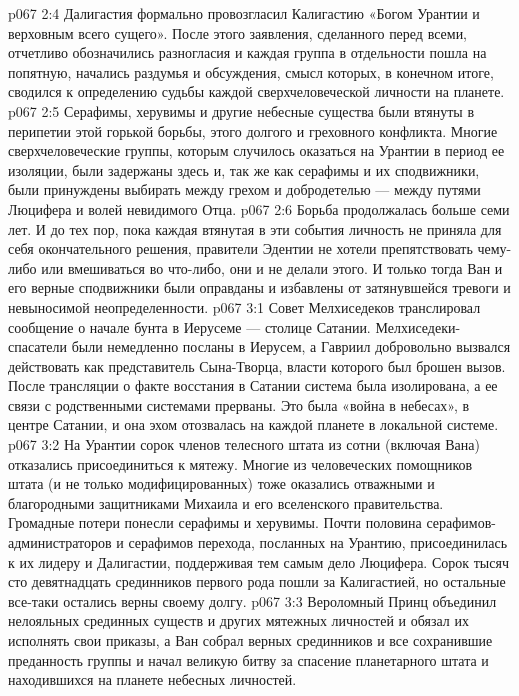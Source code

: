 \vs p067 2:4 \pc Далигастия формально провозгласил Калигастию «Богом Урантии и верховным всего сущего». После этого заявления, сделанного перед всеми, отчетливо обозначились разногласия и каждая группа в отдельности пошла на попятную, начались раздумья и обсуждения, смысл которых, в конечном итоге, сводился к определению судьбы каждой сверхчеловеческой личности на планете.
\vs p067 2:5 Серафимы, херувимы и другие небесные существа были втянуты в перипетии этой горькой борьбы, этого долгого и греховного конфликта. Многие сверхчеловеческие группы, которым случилось оказаться на Урантии в период ее изоляции, были задержаны здесь и, так же как серафимы и их сподвижники, были принуждены выбирать между грехом и добродетелью --- между путями Люцифера и волей невидимого Отца.
\vs p067 2:6 Борьба продолжалась больше семи лет. И до тех пор, пока каждая втянутая в эти события личность не приняла для себя окончательного решения, правители Эдентии не хотели препятствовать чему\hyp{}либо или вмешиваться во что\hyp{}либо, они и не делали этого. И только тогда Ван и его верные сподвижники были оправданы и избавлены от затянувшейся тревоги и невыносимой неопределенности.
\vs p067 3:1 Совет Мелхиседеков транслировал сообщение о начале бунта в Иерусеме --- столице Сатании. Мелхиседеки\hyp{}спасатели были немедленно посланы в Иерусем, а Гавриил добровольно вызвался действовать как представитель Сына\hyp{}Творца, власти которого был брошен вызов. После трансляции о факте восстания в Сатании система была изолирована, а ее связи с родственными системами прерваны. Это была «война в небесах», в центре Сатании, и она эхом отозвалась на каждой планете в локальной системе.
\vs p067 3:2 На Урантии сорок членов телесного штата из сотни (включая Вана) отказались присоединиться к мятежу. Многие из человеческих помощников штата (и не только модифицированных) тоже оказались отважными и благородными защитниками Михаила и его вселенского правительства. Громадные потери понесли серафимы и херувимы. Почти половина серафимов\hyp{}администраторов и серафимов перехода, посланных на Урантию, присоединилась к их лидеру и Далигастии, поддерживая тем самым дело Люцифера. Сорок тысяч сто девятнадцать срединников первого рода пошли за Калигастией, но остальные все\hyp{}таки остались верны своему долгу.
\vs p067 3:3 Вероломный Принц объединил нелояльных срединных существ и других мятежных личностей и обязал их исполнять свои приказы, а Ван собрал верных срединников и все сохранившие преданность группы и начал великую битву за спасение планетарного штата и находившихся на планете небесных личностей.
